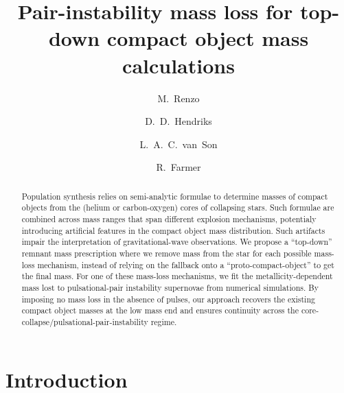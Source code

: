 \documentclass[twocolumn]{aastex63}
\begin{document}
\title{Pair-instability mass loss for top-down compact object mass calculations}

\author[0000-0002-6718-9472]{M.~Renzo}

\author[0000-0002-8717-6046]{D.~D.~Hendriks}

\author[0000-0001-5484-4987]{L.~A.~C.~van~Son}

\author[0000-0003-3441-7624]{R.~Farmer}

\begin{abstract}
  \noindent
  Population synthesis relies on semi-analytic formulae to determine
  masses of compact objects from the (helium or carbon-oxygen) cores
  of collapsing stars. Such formulae are combined across mass ranges
  that span different explosion mechanisms, potentialy introducing
  artificial features in the compact object mass distribution. Such
  artifacts impair the interpretation of gravitational-wave
  observations. We propose a ``top-down'' remnant mass prescription
  where we remove mass from the star for each possible mass-loss
  mechanism, instead of relying on the fallback onto a
  ``proto-compact-object'' to get the final mass. For one of these
  mass-loss mechanisms, we fit the metallicity-dependent mass lost to
  pulsational-pair instability supernovae from numerical
  simulations. By imposing no mass loss in the absence of pulses, our
  approach recovers the existing compact object masses at the low mass
  end and ensures continuity across the
  core-collapse/pulsational-pair-instability regime. %
\end{abstract}

\section{Introduction}
\end{document}
